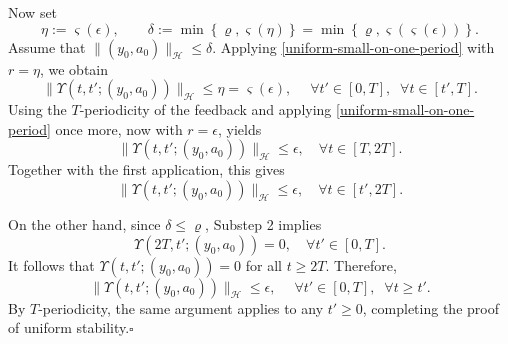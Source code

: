 \documentclass[a4paper]{article}
\numberwithin{equation}{section}
\begin{document}
\begin{appendices}
Now set
$$\eta:=\varsigma\left(\epsilon\right),
\qquad
\delta:=\min\left\{\varrho,\varsigma\left(\eta\right)\right\}=\min\left\{\varrho,\varsigma\left(\varsigma(\epsilon)\right)\right\}.$$
Assume that $\|(y_0,a_0)\|_{\mathcal H}\le\delta$. Applying
\eqref{uniform-small-on-one-period} with $r=\eta$, we obtain
$$\|\Upsilon(t,t';(y_0,a_0))\|_{\mathcal H}\le \eta=\varsigma\left(\epsilon\right),
\quad\; \forall t'\in[0,T],\;\;\forall t\in [t',T].$$
Using the $T$-periodicity of the feedback and applying
\eqref{uniform-small-on-one-period} once more, now with $r=\epsilon$, yields
$$\|\Upsilon(t,t';(y_0,a_0))\|_{\mathcal H}\le \epsilon,\quad \forall t\in[T,2T].$$
Together with the first application, this gives
$$\|\Upsilon(t,t';(y_0,a_0))\|_{\mathcal H}\le \epsilon,\quad \forall t\in[t',2T].$$

On the other hand, since $\delta\le\varrho$, Substep 2 implies
$$\Upsilon(2T,t';(y_0,a_0))=0,\quad \forall t'\in[0,T].$$
It follows that $\Upsilon(t,t';(y_0,a_0))=0$ for all $ t\ge 2T$. Therefore,
$$\|\Upsilon(t,t';(y_0,a_0))\|_{\mathcal H}\le \epsilon,\quad \;\forall t'\in[0,T],\;\;\forall t\ge t'.$$
By $T$-periodicity, the same argument applies to any $t'\ge0$, completing the proof of uniform stability.\hfill$\square$
\end{appendices}


  

\end{document}
